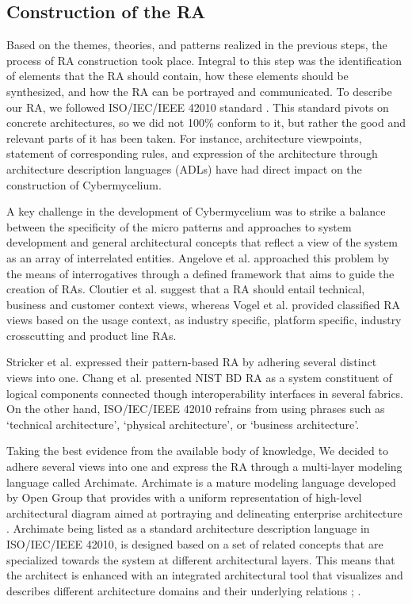 \documentclass[review]{elsarticle}
\begin{document}
\subsection{Construction of the RA}

Based on the themes, theories, and patterns realized in the previous steps, the process of RA construction took place. Integral to this step was the identification of elements that the RA should contain, how these elements should be synthesized, and how the RA can be portrayed and communicated. To describe our RA, we followed ISO/IEC/IEEE 42010 standard \cite{ISO42010}. This standard pivots on concrete architectures, so we did not 100\% conform to it, but rather the good and relevant parts of it has been taken. For instance, architecture viewpoints, statement of corresponding rules, and expression of the architecture through architecture description languages (ADLs) have had direct impact on the construction of Cybermycelium.

A key challenge in the development of Cybermycelium was to strike a balance between the specificity of the micro patterns and approaches to system development and general architectural concepts that reflect a view of the system as an array of interrelated entities. Angelove et al. \cite{angelov2012framework} approached this problem by the means of interrogatives through a defined framework that aims to guide the creation of RAs.
Cloutier et al. \cite{Cloutier} suggest that a RA should entail technical, business and customer context views, whereas Vogel et al. \cite{vogel2009software} provided classified RA views based on the usage context, as industry specific, platform specific, industry crosscutting and product line RAs.

Stricker et al. \cite{Stricker} expressed their pattern-based RA by adhering several distinct views into one. Chang et al. \cite{Chang} presented NIST BD RA as a system constituent of logical components connected though interoperability interfaces in several fabrics. On the other hand, ISO/IEC/IEEE 42010 refrains from using phrases such as `technical architecture', `physical architecture', or `business architecture'.

Taking the best evidence from the available body of knowledge, We decided to adhere several views into one and express the RA through a multi-layer modeling language called Archimate. Archimate is a mature modeling language developed by Open Group that provides with a uniform representation of high-level architectural diagram aimed at portraying and delineating enterprise architecture \cite{lankhorst2013language}. Archimate being listed as a standard architecture description language in ISO/IEC/IEEE 42010, is designed based on a set of related concepts that are specialized towards the system at different architectural layers. This means that the architect is enhanced with an integrated architectural tool that visualizes and describes different architecture domains and their underlying relations \cite{lankhorst2010anatomy}; \cite{engelsman2011extending}.
\end{document}
